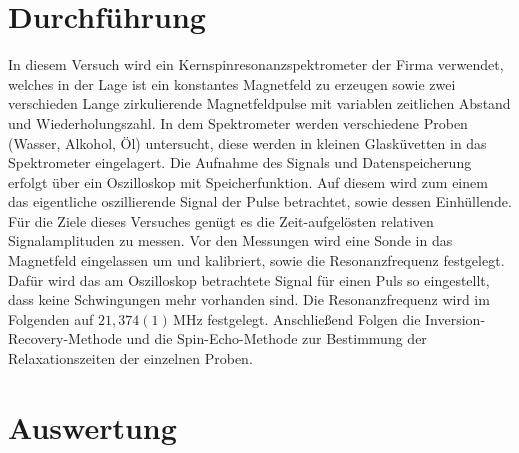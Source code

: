 \documentclass[numbers=noenddot,a4paper,notitlepage,twoside,BCOR15mm]{scrartcl}
\begin{document}
	\section{Durchführung}
	In diesem Versuch wird ein Kernspinresonanzspektrometer der Firma verwendet, welches in der Lage ist ein konstantes Magnetfeld zu erzeugen sowie zwei verschieden Lange zirkulierende Magnetfeldpulse mit variablen zeitlichen Abstand und Wiederholungszahl. In dem Spektrometer werden verschiedene Proben (Wasser, Alkohol, Öl) untersucht, diese werden in kleinen Glasküvetten in das Spektrometer eingelagert. Die Aufnahme des Signals und Datenspeicherung erfolgt über ein Oszilloskop mit Speicherfunktion. Auf diesem wird zum einem das eigentliche oszillierende Signal der Pulse betrachtet, sowie dessen Einhüllende. Für die Ziele dieses Versuches genügt es die Zeit-aufgelösten relativen Signalamplituden zu messen. Vor den Messungen wird eine Sonde in das Magnetfeld eingelassen um und kalibriert, sowie die Resonanzfrequenz festgelegt. Dafür wird das am Oszilloskop betrachtete Signal für einen Puls so eingestellt, dass keine Schwingungen mehr vorhanden sind. Die Resonanzfrequenz wird im Folgenden auf $21,374(1)\,\mathrm{MHz}$ festgelegt. Anschließend Folgen die Inversion-Recovery-Methode und die Spin-Echo-Methode zur Bestimmung der Relaxationszeiten der einzelnen Proben.
	\newpage
	\section{Auswertung}
	
\end{document}
